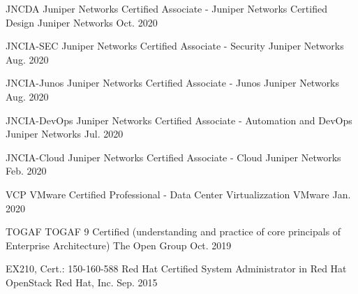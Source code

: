 \begin{cvhonors}


\cvhonor
{JNCDA} %
{Juniper Networks Certified Associate - Juniper Networks Certified Design} %
{Juniper Networks} %
{Oct. 2020} %


\cvhonor
{JNCIA-SEC} %
{Juniper Networks Certified Associate - Security} %
{Juniper Networks} %
{Aug. 2020} %


\cvhonor
{JNCIA-Junos} %
{Juniper Networks Certified Associate - Junos} %
{Juniper Networks} %
{Aug. 2020} %


\cvhonor
{JNCIA-DevOps} %
{Juniper Networks Certified Associate - Automation and DevOps} %
{Juniper Networks} %
{Jul. 2020} %


\cvhonor
{JNCIA-Cloud} %
{Juniper Networks Certified Associate - Cloud} %
{Juniper Networks} %
{Feb. 2020} %


\cvhonor
{VCP} %
{VMware Certified Professional - Data Center Virtualizzation} %
{VMware} %
{Jan. 2020} %


\cvhonor
{TOGAF} %
{TOGAF 9 Certified (understanding and practice of core principals of Enterprise Architecture) } %
{The Open Group\texttrademark} %
{Oct. 2019} %



\cvhonor
{EX210, Cert.: 150-160-588} %
{Red Hat Certified System Administrator in Red Hat OpenStack} %
{Red Hat, Inc.} %
{Sep. 2015} %


\end{cvhonors}
